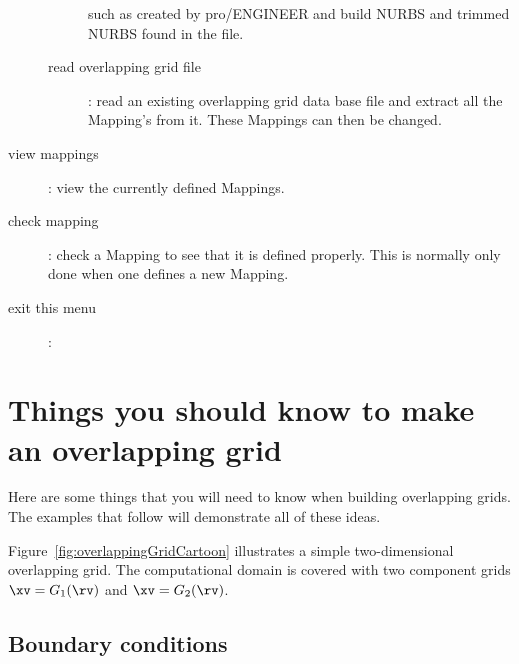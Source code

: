 \documentclass[xcolor=rgb,svgnames,dvipsnames]{article}
\begin{document}
\begin{description}
\begin{description}
        such as created by pro/ENGINEER and build NURBS and trimmed NURBS found in the file.
    \item[read overlapping grid file] : read an existing overlapping grid data base file and extract all
      the Mapping's from it. These Mappings can then be changed.
  \end{description}
  \item[view mappings] : view the currently defined Mappings.
  \item[check mapping] : check a Mapping to see that it is defined properly. This is normally only done
     when one defines a new Mapping.
  \item[exit this menu] :
\end{description}




\section{Things you should know to make an overlapping grid}


Here are some things that you will need to know when building overlapping grids. 
The examples that follow will demonstrate all of these ideas.



Figure~\ref{fig:overlappingGridCartoon} illustrates a simple two-dimensional overlapping grid. The computational
domain is covered with two component grids $\xv=G_1(\rv)$ and $\xv=G_2(\rv)$. 




\subsection{Boundary conditions}\label{sec:bc}
\end{document}
